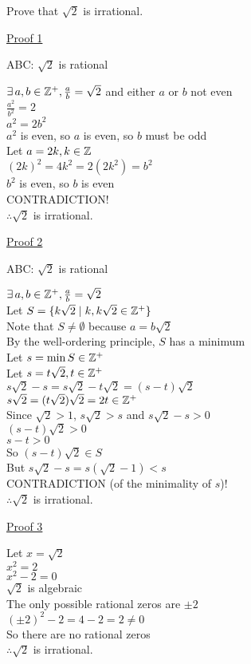 \documentclass[letterpaper,12pt,fleqn]{article}
\begin{document}
\begin{example}
  Prove that $\sqrt{2}$ is irrational.

  \underline{Proof 1}

  ABC: $\sqrt{2}$ is rational

  $\exists\,a,b\in\mathbb{Z}^+,\frac{a}{b}=\sqrt{2}$ and either $a$ or $b$ not even \\
  $\frac{a^2}{b^2}=2$ \\
  $a^2=2b^2$ \\
  $a^2$ is even, so $a$ is even, so $b$ must be odd \\
  Let $a=2k,k\in\mathbb{Z}$ \\
  $(2k)^2=4k^2=2(2k^2)=b^2$ \\
  $b^2$ is even, so $b$ is even \\
  CONTRADICTION! \\
  $\therefore\sqrt{2}$ is irrational.

  \bigskip

  \underline {Proof 2}

  ABC: $\sqrt{2}$ is rational

  $\exists\,a,b\in\mathbb{Z}^+,\frac{a}{b}=\sqrt{2}$ \\
  Let $S=\{k\sqrt{2}\mid k,k\sqrt{2}\in\mathbb{Z}^+\}$ \\
  Note that $S\ne\emptyset$ because $a=b\sqrt{2}$ \\
  By the well-ordering principle, $S$ has a minimum \\
  Let $s=\min S\in\mathbb{Z}^+$ \\
  Let $s=t\sqrt{2},t\in\mathbb{Z}^+$ \\
  $s\sqrt{2}-s=s\sqrt{2}-t\sqrt{2}=(s-t)\sqrt{2}$ \\
  $s\sqrt{2}=(t\sqrt{2})\sqrt{2}=2t\in\mathbb{Z}^+$ \\
  Since $\sqrt{2}>1$, $s\sqrt{2}>s$ and $s\sqrt{2}-s>0$ \\
  $(s-t)\sqrt{2}>0$ \\
  $s-t>0$ \\
  So $(s-t)\sqrt{2}\in S$ \\
  But $s\sqrt{2}-s=s(\sqrt{2}-1)<s$ \\
  CONTRADICTION (of the minimality of $s$)! \\
  $\therefore\sqrt{2}$ is irrational.

  \bigskip

  \underline {Proof 3}

  Let $x=\sqrt{2}$ \\
  $x^2=2$ \\
  $x^2-2=0$ \\
  $\sqrt{2}$ is algebraic \\
  The only possible rational zeros are $\pm2$ \\
  $(\pm2)^2-2=4-2=2\ne0$ \\
  So there are no rational zeros \\
  $\therefore\sqrt{2}$ is irrational.
\end{example}
\end{document}
